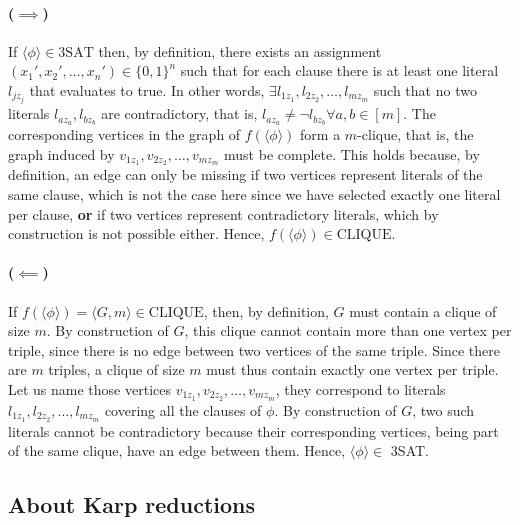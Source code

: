 \documentclass{article}
\DeclareMathOperator{\Forall}{\forall}
\begin{document}
\paragraph{(\(\implies\))} If \(\langle\phi\rangle \in \text{3SAT}\) then, by definition,
there exists an assignment \((x_1', x_2', \ldots, x_n') \in \{0,1\}^n\) such
that for each clause there is at least one literal \(l_{jz_j}\) that evaluates
to true. In other words, \(\exists l_{1z_1},l_{2z_2},\ldots,l_{mz_m}\) such
that no two literals \(l_{az_a},l_{bz_b}\) are contradictory, that is,
\(l_{az_a} \neq \lnot l_{bz_b} \Forall a,b \in [m]\). The corresponding
vertices in the graph of \(f(\langle \phi \rangle)\) form a \(m\)-clique, that
is, the graph induced by \(v_{1z_1},v_{2z_2},\ldots,v_{mz_m}\) must be
complete. This holds because, by definition, an edge can only be missing if two
vertices represent literals of the same clause, which is not the case here
since we have selected exactly one literal per clause, \textbf{or} if two
vertices represent contradictory literals, which by construction is not
possible either. Hence, \(f(\langle \phi \rangle) \in \text{CLIQUE}\).

\paragraph{(\(\impliedby\))} If \(f(\langle \phi \rangle) = \langle G, m \rangle \in \text{CLIQUE}\),
then, by definition, \(G\) must contain a clique of size \(m\). By
construction of \(G\), this clique cannot contain more than one vertex per
triple, since there is no edge between two vertices of the same triple. Since
there are \(m\) triples, a clique of size \(m\) must thus contain exactly one
vertex per triple. Let us name those vertices
\(v_{1z_1},v_{2z_2},\ldots,v_{mz_m}\), they correspond to literals
\(l_{1z_1},l_{2z_2},\ldots,l_{mz_m}\) covering all the clauses of \(\phi\).
By construction of \(G\), two such literals cannot be contradictory because
their corresponding vertices, being part of the same clique, have an edge
between them. Hence, \(\langle \phi \rangle \in\) 3SAT.

\subsection{About Karp reductions}
\end{document}
